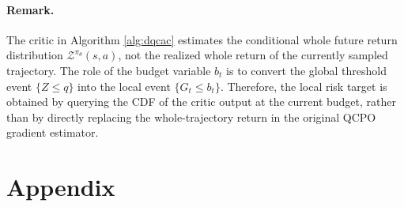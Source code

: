 \paragraph{Remark.}
The critic in Algorithm \ref{alg:dqcac} estimates the conditional whole future return distribution $\mathcal{Z}^{\pi_{\theta}}(s,a)$, not the realized whole return of the currently sampled trajectory. The role of the budget variable $b_t$ is to convert the global threshold event $\{Z\le q\}$ into the local event $\{G_t\le b_t\}$. Therefore, the local risk target is obtained by querying the CDF of the critic output at the current budget, rather than by directly replacing the whole-trajectory return in the original QCPO gradient estimator.

\newpage

\section{Appendix}

